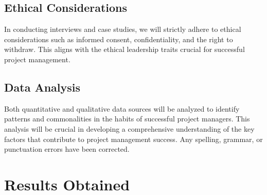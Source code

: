 \documentclass{article}
\begin{document}
\subsection{Ethical Considerations}
In conducting interviews and case studies, we will strictly adhere to ethical considerations such as informed consent, confidentiality, and the right to withdraw. This aligns with the ethical leadership traits crucial for successful project management\cite{Project_Management_Techniques}.
\subsection{Data Analysis}
Both quantitative and qualitative data sources will be analyzed to identify patterns and commonalities in the habits of successful project managers. This analysis will be crucial in developing a comprehensive understanding of the key factors that contribute to project management success. Any spelling, grammar, or punctuation errors have been corrected.


\newpage
\section{Results Obtained}
\end{document}
